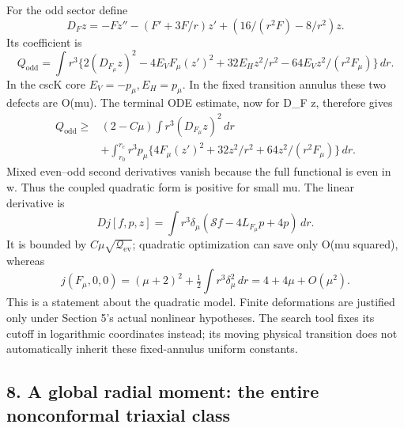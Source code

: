 \documentclass[
  10pt,
]{article}
\begin{document}
For the odd sector define \[
 D_Fz=-Fz''-(F'+3F/r)z'+(16/(r^2F)-8/r^2)z.
\] Its coefficient is \[
 Q_{\mathrm{odd}}=\int r^3
 \{2(D_{F_\mu}z)^2-4E_VF_\mu(z')^2
                     +32E_Hz^2/r^2-64E_Vz^2/(r^2F_\mu)\}\,dr.
\] In the cscK core \(E_V=-p_\mu,E_H=p_\mu\). In the fixed transition
annulus these two defects are O(mu). The terminal ODE estimate, now for
D\_F z, therefore gives \[
\begin{aligned}
 Q_{\mathrm{odd}}\ge{}&(2-C\mu)\int r^3(D_{F_\mu}z)^2\,dr\\
 &+\int_{r_0}^{r_c}r^3p_\mu
       \{4F_\mu(z')^2+32z^2/r^2+64z^2/(r^2F_\mu)\}\,dr.
\end{aligned}                                                     \tag{7.2}
\] Mixed even--odd second derivatives vanish because the full functional
is even in w. Thus the coupled quadratic form is positive for small mu.
The linear derivative is \[
 Dj[f,p,z]=\int r^3\delta_\mu
                           (\mathcal Sf-4L_{F_\mu}p+4p)\,dr.
\] It is bounded by \(C\mu\sqrt{\mathcal Q_{\mathrm{ev}}}\); quadratic
optimization can save only O(mu squared), whereas \[
 j(F_\mu,0,0)=(\mu+2)^2+\tfrac12\int r^3\delta_\mu^2\,dr
                                      =4+4\mu+O(\mu^2).
\] This is a statement about the quadratic model. Finite deformations
are justified only under Section 5's actual nonlinear hypotheses. The
search tool fixes its cutoff in logarithmic coordinates instead; its
moving physical transition does not automatically inherit these
fixed-annulus uniform constants.

\hypertarget{a-global-radial-moment-the-entire-nonconformal-triaxial-class}{%
\subsection{8. A global radial moment: the entire nonconformal triaxial
class}\label{a-global-radial-moment-the-entire-nonconformal-triaxial-class}}
\end{document}
